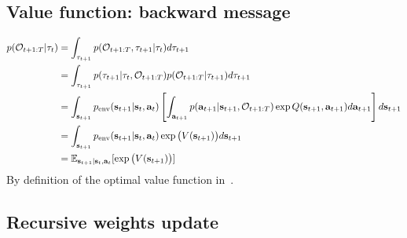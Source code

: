 \subsection{Value function: backward message}
 \label{app:backward_message}
\begin{align}
    p({\mathcal{O}}_{t+1:T} | \tau_t) &=  \int_{\tau_{t+1}} p({\mathcal{O}}_{t+1:T}, \tau_{t+1} | \tau_t)d\tau_{t+1} \nonumber\\
     &=  \int_{\tau_{t+1}} p(\tau_{t+1} | \tau_{t}, {\mathcal{O}}_{t+1:T}) p({\mathcal{O}}_{t+1:T} | \tau_{t+1}) d\tau_{t+1}  \nonumber\\
     &= \int_{{\mathbf{s}}_{t+1}}  p_{\text{env}}({\mathbf{s}}_{t+1} | {\mathbf{s}}_t, {\mathbf{a}}_t) \left[ \int_{{\mathbf{a}}_{t+1}} p({\mathbf{a}}_{t+1} | {\mathbf{s}}_{t+1}, {\mathcal{O}}_{t+1:T}) \exp Q({\mathbf{s}}_{t+1}, {\mathbf{a}}_{t+1}) d{\mathbf{a}}_{t+1}  \right] d{\mathbf{s}}_{t+1}\nonumber\\
     &= \int_{{\mathbf{s}}_{t+1}} p_{\text{env}}({\mathbf{s}}_{t+1} | {\mathbf{s}}_t, {\mathbf{a}}_t)  \exp \big( V({\mathbf{s}}_{t+1}) \big) d{\mathbf{s}}_{t+1}\nonumber\\
       &= \mathbb{E}_{{\mathbf{s}}_{t+1} | {\mathbf{s}}_t, {\mathbf{a}}_t} [ \exp \big( V({\mathbf{s}}_{t+1}) \big)]
\end{align}
By definition of the optimal value function in~\citep{levine2018reinforcement}.


\subsection{Recursive weights update}


